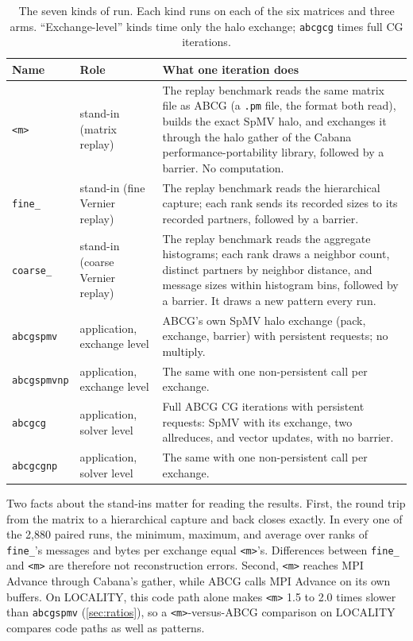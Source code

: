 \documentclass[11pt]{article}
\newcommand{\kM}{\texttt{<m>}}
\newcommand{\kF}{\texttt{fine\_}}
\newcommand{\kC}{\texttt{coarse\_}}
\newcommand{\spmv}{\texttt{abcgspmv}}
\newcommand{\cg}{\texttt{abcgcg}}
\newcommand{\spmvnp}{\texttt{abcgspmvnp}}
\newcommand{\cgnp}{\texttt{abcgcgnp}}
\begin{document}
\begin{table}[t]
\centering
\small
\caption{The seven kinds of run. Each kind runs on each of the six matrices and three
arms. ``Exchange-level'' kinds time only the halo exchange; \cg{} times full CG
iterations.}
\label{tab:kinds}
\begin{tabular}{@{}lp{2.6cm}p{8.6cm}@{}}
\toprule
Name & Role & What one iteration does \\
\midrule
\kM & stand-in (matrix replay) & The replay benchmark reads the same matrix file as ABCG
(a \texttt{.pm} file, the format both read), builds the exact SpMV halo, and exchanges it through the halo gather of the Cabana
performance-portability library, followed by a barrier. No computation. \\
\kF & stand-in (fine Vernier replay) & The replay benchmark reads the hierarchical capture;
each rank sends its recorded sizes to its recorded partners, followed by a barrier. \\
\kC & stand-in (coarse Vernier replay) & The replay benchmark reads the aggregate
histograms; each rank draws a neighbor count, distinct partners by neighbor distance, and
message sizes within histogram bins, followed by a barrier. It draws a new pattern every
run. \\
\spmv & application, exchange level & ABCG's own SpMV halo exchange (pack, exchange,
barrier) with persistent requests; no multiply. \\
\spmvnp & application, exchange level & The same with one non-persistent call per
exchange. \\
\cg & application, solver level & Full ABCG CG iterations with persistent requests: SpMV
with its exchange, two allreduces, and vector updates, with no barrier. \\
\cgnp & application, solver level & The same with one non-persistent call per exchange. \\
\bottomrule
\end{tabular}
\end{table}

Two facts about the stand-ins matter for reading the results. First, the round trip from
the matrix to a hierarchical capture and back closes exactly. In every one of the 2,880
paired runs, the minimum, maximum, and average over ranks of \kF's messages and bytes per
exchange equal \kM's. Differences between \kF{} and \kM{} are therefore not reconstruction
errors. Second, \kM{} reaches MPI Advance through Cabana's gather, while ABCG calls MPI
Advance on its own buffers. On LOCALITY, this code path alone makes \kM{} 1.5 to 2.0
times slower than \spmv{} (\cref{sec:ratios}), so a \kM-versus-ABCG comparison on LOCALITY
compares code paths as well as patterns.
\end{document}
